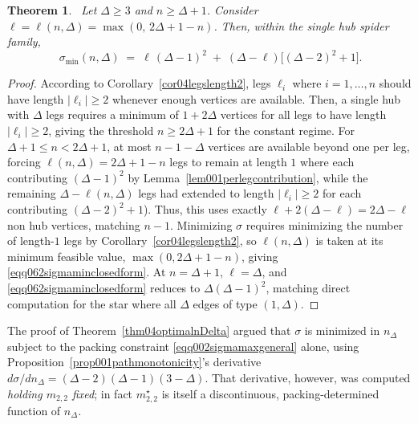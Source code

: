 \documentclass[12pt]{amsart}
\newtheorem{theorem}{Theorem}[section]
\begin{document}
\begin{theorem}~\label{thm07sigmaminclosedform}
Let $\Delta\geqslant 3$ and $n\geqslant \Delta+1$. Consider  $\ell=\ell(n,\Delta)=\max(0,\,2\Delta+1-n)$.
Then, within the single hub spider family,
\begin{equation}~\label{eqq062sigmaminclosedform}
\sigma_{\min}(n,\Delta) \;=\; \ell\,(\Delta-1)^2 \;+\; (\Delta-\ell)\big[(\Delta-2)^2+1\big].
\end{equation}
\end{theorem}
\begin{proof}
According to Corollary~\ref{cor04legslength2}, legs $\ell_i$ where $i=1,\dots,n$ should have length $|\ell_i|\geqslant 2$
whenever enough vertices are available. Then, a single hub with $\Delta$ legs requires a minimum of $1+2\Delta$ vertices for  all legs to have
length $|\ell_i|\geqslant 2$, giving the threshold $n\geqslant 2\Delta+1$ for the constant regime.
For $\Delta+1\leqslant n<2\Delta+1$, at most $n-1-\Delta$ vertices are available
beyond one per leg, forcing $\ell(n,\Delta)=2\Delta+1-n$ legs to remain at length $1$ where each contributing $(\Delta-1)^2$ by
Lemma~\ref{lem001perlegcontribution}, while the remaining
$\Delta-\ell(n,\Delta)$ legs had extended to length $|\ell_i|\geqslant 2$ for each
contributing $(\Delta-2)^2+1$). Thus, this uses exactly
$\ell + 2(\Delta-\ell) = 2\Delta-\ell$ non hub vertices, matching
$n-1$. Minimizing $\sigma$ requires minimizing the number of
length-$1$ legs by Corollary~\ref{cor04legslength2}, so $\ell(n,\Delta)$ is taken at its minimum feasible value, $\max(0,2\Delta+1-n)$, giving
\eqref{eqq062sigmaminclosedform}.   At $n=\Delta+1$, $\ell=\Delta$, and
\eqref{eqq062sigmaminclosedform} reduces to $\Delta(\Delta-1)^2$, matching
direct computation for the star where all $\Delta$ edges of type $(1,\Delta)$.
\end{proof}

The proof of Theorem~\ref{thm04optimalnDelta} argued that $\sigma$ is minimized in $n_\Delta$ subject to the packing constraint
\eqref{eqq002sigmamaxgeneral} alone, using
Proposition~\ref{prop001pathmonotonicity}'s derivative
$d\sigma/dn_\Delta=(\Delta-2)(\Delta-1)(3-\Delta)$. That derivative, however,
was computed \emph{holding $m_{2,2}$ fixed}; in fact $m_{2,2}^\star$ is
itself a discontinuous, packing-determined function of $n_\Delta$.
\end{document}
